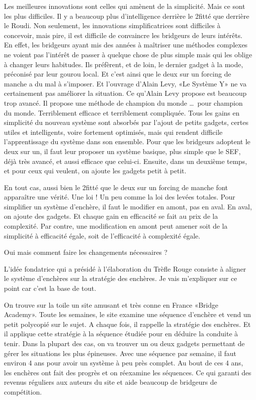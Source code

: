 Les meilleures innovations sont celles qui amènent de la simplicité. Mais ce sont les plus difficiles. Il y a beaucoup plus d'intelligence derrière le 2\NT fitté que derrière le Roudi. Non seulement, les innovations simplificatrices sont difficiles à concevoir, mais pire, il est difficile de convaincre les bridgeurs de leurs intérêts. En effet, les bridgeurs ayant mis des années à maîtriser une méthodes complexes ne voient pas l'intérêt de passer à quelque chose de plus simple mais qui les oblige à changer leurs habitudes. Ils préfèrent, et de loin, le dernier gadget à la mode, préconisé par leur gourou local. Et c'est ainsi que le deux sur un forcing de manche a du mal à s'imposer. Et l'ouvrage d'Alain Levy, «Le Système Y» ne va certainement pas améliorer la situation. Ce qu'Alain Levy propose est beaucoup trop avancé. Il propose une méthode de champion du monde \dots\ pour champion du monde. Terriblement efficace et terriblement compliquée. Tous les gains en simplicité du nouveau système sont absorbés par l'ajout de petits gadgets, certes utiles et intelligents, voire fortement optimisés, mais qui rendent difficile l'apprentissage du système dans son ensemble.
Pour que les bridgeurs adoptent le deux sur un, il faut leur proposer un système basique, plus simple que le SEF, déjà très avancé, et aussi efficace que celui-ci. Ensuite, dans un deuxième temps, et pour ceux qui veulent, on ajoute les gadgets petit à petit.

En tout cas, aussi bien le 2\NT fitté que le deux sur un forcing de manche font apparaître une vérité. Une loi ! Un peu comme la loi des levées totales. Pour simplifier un système d'enchère, il faut le modifier en amont, pas en aval. En aval, on ajoute des gadgets. Et chaque gain en efficacité se fait au prix de la complexité. Par contre, une modification en amont peut amener soit de la simplicité à efficacité égale, soit de l'efficacité à complexité égale.

Oui mais comment faire les changements nécessaires ?

L'idée fondatrice qui a présidé à l'élaboration du Trèfle Rouge consiste à aligner le système d'enchères sur la stratégie des enchères. Je vais m'expliquer sur ce point car c'est la base de tout.

On trouve sur la toile un site amusant et très conne en France «Bridge Academy». Toute les semaines, le site examine une séquence d'enchère et vend un petit polycopié sur le sujet. A chaque fois, il rappelle la stratégie des enchères. Et il applique cette stratégie à la séquence
étudiée pour en déduire la conduite à tenir. Dans la plupart des cas, on va trouver un ou deux gadgets permettant de gérer les situations les plus épineuses. Avec une séquence par semaine, il faut environ 4 ans pour avoir un système à peu près complet. Au bout de ces 4 ans, les enchères ont fait des progrès et on réexamine les séquences. Ce qui garanti des revenus réguliers aux auteurs du site et aide beaucoup de bridgeurs de compétition.

